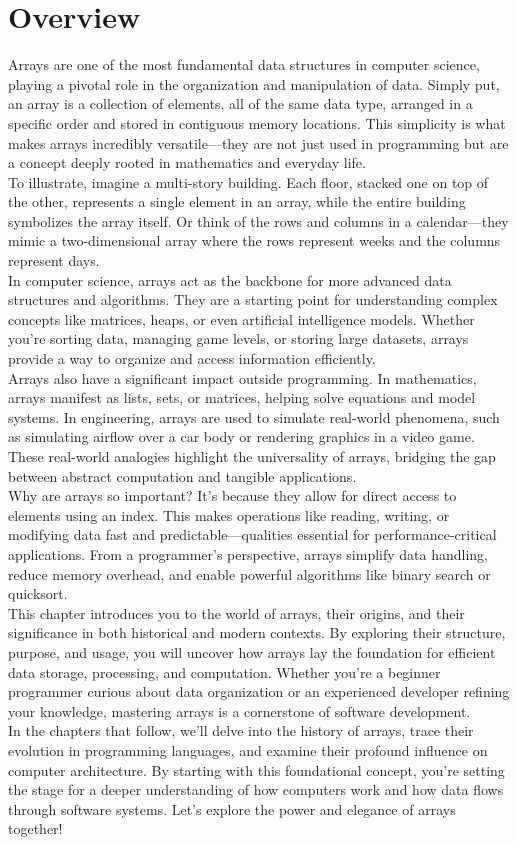 \documentclass[12pt, oneside]{book}
\begin{document}
	\section{Overview}
	Arrays are one of the most fundamental data structures in computer science, playing a pivotal role in the organization and manipulation of data. Simply put, an array is a collection of elements, all of the same data type, arranged in a specific order and stored in contiguous memory locations. This simplicity is what makes arrays incredibly versatile—they are not just used in programming but are a concept deeply rooted in mathematics and everyday life.\\
	To illustrate, imagine a multi-story building. Each floor, stacked one on top of the other, represents a single element in an array, while the entire building symbolizes the array itself. Or think of the rows and columns in a calendar—they mimic a two-dimensional array where the rows represent weeks and the columns represent days.\\
	In computer science, arrays act as the backbone for more advanced data structures and algorithms. They are a starting point for understanding complex concepts like matrices, heaps, or even artificial intelligence models. Whether you’re sorting data, managing game levels, or storing large datasets, arrays provide a way to organize and access information efficiently.\\
	Arrays also have a significant impact outside programming. In mathematics, arrays manifest as lists, sets, or matrices, helping solve equations and model systems. In engineering, arrays are used to simulate real-world phenomena, such as simulating airflow over a car body or rendering graphics in a video game. These real-world analogies highlight the universality of arrays, bridging the gap between abstract computation and tangible applications.\\
	Why are arrays so important? It’s because they allow for direct access to elements using an index. This makes operations like reading, writing, or modifying data fast and predictable—qualities essential for performance-critical applications. From a programmer’s perspective, arrays simplify data handling, reduce memory overhead, and enable powerful algorithms like binary search or quicksort.\\
	This chapter introduces you to the world of arrays, their origins, and their significance in both historical and modern contexts. By exploring their structure, purpose, and usage, you will uncover how arrays lay the foundation for efficient data storage, processing, and computation. Whether you're a beginner programmer curious about data organization or an experienced developer refining your knowledge, mastering arrays is a cornerstone of software development.\\
	In the chapters that follow, we’ll delve into the history of arrays, trace their evolution in programming languages, and examine their profound influence on computer architecture. By starting with this foundational concept, you’re setting the stage for a deeper understanding of how computers work and how data flows through software systems. Let’s explore the power and elegance of arrays together!
\end{document}
